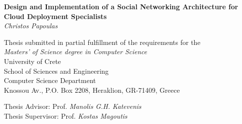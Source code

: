 \begin{titlepage}
\begin{center}

\LARGE \textbf{Design and Implementation of a Social Networking Architecture for Cloud Deployment Specialists}\\[0.5cm]
\LARGE \textit{Christos Papoulas}\\[0.5cm]

\vfill

\normalsize{
Thesis submitted in partial fulfillment of the requirements for the\\[0.30cm]

\textit{Masters' of Science degree in Computer Science}}\\[0.30cm]

University of Crete\\
School of Sciences and Engineering\\
Computer Science Department\\
Knossou Av., P.O. Box 2208, Heraklion, GR-71409, Greece\\[0.5cm]

\vfill

\Large{Thesis Advisor: Prof. \emph{Manolis G.H. Katevenis}}\\[0.5cm]
\Large{Thesis Supervisor: Prof. \emph{Kostas Magoutis}}\\[0.5cm]
\vfill

\end{center}

\end{titlepage}

